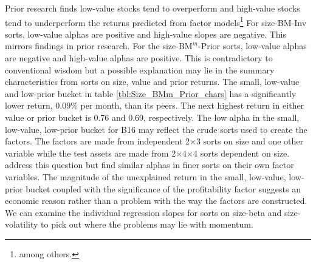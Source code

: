 Prior research finds low-value stocks tend to overperform and high-value stocks
tend to underperform the returns predicted from factor models\footnote{
\textcite{fama1992cross, fama1993common, loughran1997book, fama2006value}
among others.}
For size-BM-Inv sorts, low-value alphas are positive and
high-value slopes are negative.
This mirrors findings in prior research.
For the size-$\text{BM}^m$-Prior sorts, low-value alphas are negative and
high-value alphas are positive.
This is contradictory to conventional wisdom but a possible explanation may lie
in the summary characteristics from sorts on size, value and prior returns.
The small, low-value and low-prior bucket in table
\ref{tbl:Size_BMm_Prior_chars} has a significantly lower return, 0.09\% per
month, than its peers.
The next highest return in either value or prior bucket is 0.76 and 0.69,
respectively.
The low alpha in the small, low-value, low-prior bucket for B16 may reflect
the crude sorts used to create the factors.
The factors are made from independent 2$\times$3 sorts on size and one other
variable while the test assets are made from 2$\times$4$\times$4 sorts
dependent on size.
\textcite{fama2015five} address this question but find similar alphas in finer
sorts on their own factor variables.
The magnitude of the unexplained return in the small, low-value, low-prior
bucket coupled with the significance of the profitability factor suggests an
economic reason rather than a problem with the way the factors are constructed.
We can examine the individual regression slopes for sorts on size-beta and
size-volatility to pick out where the problems may lie with momentum.

